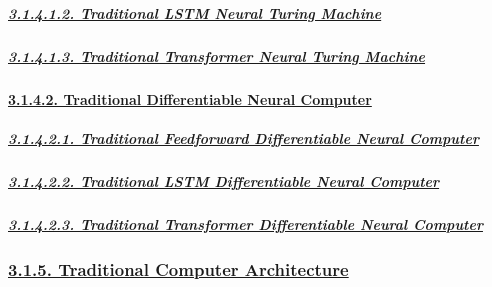 \documentclass[
]{article}
\begin{document}
\hypertarget{traditional-lstm-neural-turing-machine}{%
\subparagraph{\texorpdfstring{\protect\hyperlink{traditional-lstm-neural-turing-machine-1}{3.1.4.1.2.
Traditional LSTM Neural Turing
Machine}}{3.1.4.1.2. Traditional LSTM Neural Turing Machine}}\label{traditional-lstm-neural-turing-machine}}

\hypertarget{traditional-transformer-neural-turing-machine}{%
\subparagraph{\texorpdfstring{\protect\hyperlink{traditional-transformer-neural-turing-machine-1}{3.1.4.1.3.
Traditional Transformer Neural Turing
Machine}}{3.1.4.1.3. Traditional Transformer Neural Turing Machine}}\label{traditional-transformer-neural-turing-machine}}

\hypertarget{traditional-differentiable-neural-computer}{%
\paragraph{\texorpdfstring{\protect\hyperlink{traditional-differentiable-neural-computer-1}{3.1.4.2.
Traditional Differentiable Neural
Computer}}{3.1.4.2. Traditional Differentiable Neural Computer}}\label{traditional-differentiable-neural-computer}}

\hypertarget{traditional-feedforward-differentiable-neural-computer}{%
\subparagraph{\texorpdfstring{\protect\hyperlink{traditional-feedforward-differentiable-neural-computer-1}{3.1.4.2.1.
Traditional Feedforward Differentiable Neural
Computer}}{3.1.4.2.1. Traditional Feedforward Differentiable Neural Computer}}\label{traditional-feedforward-differentiable-neural-computer}}

\hypertarget{traditional-lstm-differentiable-neural-computer}{%
\subparagraph{\texorpdfstring{\protect\hyperlink{traditional-lstm-differentiable-neural-computer-1}{3.1.4.2.2.
Traditional LSTM Differentiable Neural
Computer}}{3.1.4.2.2. Traditional LSTM Differentiable Neural Computer}}\label{traditional-lstm-differentiable-neural-computer}}

\hypertarget{traditional-transformer-differentiable-neural-computer}{%
\subparagraph{\texorpdfstring{\protect\hyperlink{traditional-transformer-differentiable-neural-computer-1}{3.1.4.2.3.
Traditional Transformer Differentiable Neural
Computer}}{3.1.4.2.3. Traditional Transformer Differentiable Neural Computer}}\label{traditional-transformer-differentiable-neural-computer}}

\hypertarget{traditional-computer-architecture}{%
\subsubsection{\texorpdfstring{\protect\hyperlink{traditional-computer-architecture-1}{3.1.5.
Traditional Computer
Architecture}}{3.1.5. Traditional Computer Architecture}}\label{traditional-computer-architecture}}
\end{document}

